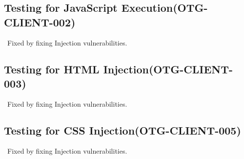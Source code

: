 \documentclass[headsepline,footsepline,footinclude=false,oneside,fontsize=11pt,paper=a4,listof=totoc,bibliography=totoc]{scrbook} %
\begin{document}
 
\subsection{Testing for JavaScript Execution(OTG-CLIENT-002)}\
Fixed by fixing Injection vulnerabilities. \\

 
\subsection{Testing for HTML Injection(OTG-CLIENT-003)}\
Fixed by fixing Injection vulnerabilities.\\ 

\subsection{Testing for CSS Injection(OTG-CLIENT-005)}\
Fixed by fixing Injection vulnerabilities.
\end{document}

